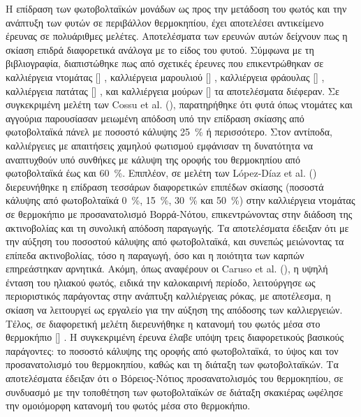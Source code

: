 \documentclass[12pt, a4paper]{report} %
\DeclareRobustCommand{\lcitep}[1]{%
  \english{[\cite{#1}]}%
}
\newcommand{\english}{\foreignlanguage{english}}
\begin{document}
Η επίδραση των φωτοβολταϊκών μονάδων ως προς την μετάδοση του φωτός και την ανάπτυξη των φυτών σε 
περιβάλλον θερμοκηπίου, έχει αποτελέσει αντικείμενο έρευνας σε πολυάριθμες μελέτες. Αποτελέσματα των ερευνών αυτών 
δείχνουν πως η σκίαση επιδρά διαφορετικά ανάλογα με το είδος του φυτού. Σύμφωνα με τη βιβλιογραφία, διαπιστώθηκε πως 
από σχετικές έρευνες που επικεντρώθηκαν σε καλλιέργεια ντομάτας 
\lcitep{eisagwgi_alg_bib24,eisagwgi_alg_bib25,eisagwgi_alg_bib14,strawberries_bib12}, καλλιέργεια μαρουλιού 
\lcitep{eisagwgi_alg_bib26}, καλλιέργεια φράουλας \lcitep{eisagwgi_alg_bib27,eisagwgi_alg_bib28,strawberries_bib13}, 
καλλιέργεια πατάτας \lcitep{eisagwgi_alg_bib29}, και καλλιέργεια μούρων \lcitep{eisagwgi_alg_bib14} τα αποτελέσματα 
διέφεραν. Σε συγκεκριμένη μελέτη των \english{Cossu et al.} (\citeyear{eisagwgi_alg_bib30}), παρατηρήθηκε ότι φυτά 
όπως ντομάτες και αγγούρια παρουσίασαν μειωμένη απόδοση υπό την επίδραση σκίασης από φωτοβολταϊκά πάνελ με ποσοστό 
κάλυψης \SI{25}{\percent} ή περισσότερο. Στον αντίποδα, καλλιέργειες με απαιτήσεις χαμηλού φωτισμού εμφάνισαν τη 
δυνατότητα να αναπτυχθούν υπό συνθήκες με κάλυψη της οροφής του θερμοκηπίου από φωτοβολταϊκά έως και \SI{60}{\percent}. 
Επιπλέον, σε μελέτη των \english{López-Díaz et al.} (\citeyear{eisagwgi_alg_bib31}) διερευνήθηκε η επίδραση τεσσάρων 
διαφορετικών επιπέδων σκίασης (ποσοστά κάλυψης από φωτοβολταϊκά \SI{0}{\percent}, \SI{15}{\percent}, \SI{30}{\percent} 
και \SI{50}{\percent}) στην καλλιέργεια ντομάτας σε θερμοκήπιο με προσανατολισμό Βορρά-Νότου, επικεντρώνοντας στην 
διάδοση της ακτινοβολίας και τη συνολική απόδοση παραγωγής. Τα αποτελέσματα έδειξαν ότι με την αύξηση του ποσοστού 
κάλυψης από φωτοβολταϊκά, και συνεπώς μειώνοντας τα επίπεδα ακτινοβολίας, τόσο η παραγωγή, όσο και η ποιότητα των 
καρπών επηρεάστηκαν αρνητικά. Ακόμη, όπως αναφέρουν οι \english{Caruso et al.} (\citeyear{strawberries_bib28}), 
η υψηλή ένταση του ηλιακού φωτός, ειδικά την καλοκαιρινή περίοδο, λειτούργησε ως περιοριστικός παράγοντας στην ανάπτυξη 
καλλιέργειας ρόκας, με αποτέλεσμα, η σκίαση να λειτουργεί ως εργαλείο για την αύξηση της απόδοσης των καλλιεργειών. 
Τέλος, σε διαφορετική μελέτη διερευνήθηκε η κατανομή του φωτός μέσα στο θερμοκήπιο 
\lcitep{eisagwgi_alg_bib32}. Η συγκεκριμένη έρευνα έλαβε υπόψη τρεις διαφορετικούς βασικούς παράγοντες: το ποσοστό 
κάλυψης της οροφής από φωτοβολταϊκά, το ύψος και τον προσανατολισμό του θερμοκηπίου, καθώς και τη διάταξη των 
φωτοβολταϊκών. Τα αποτελέσματα έδειξαν ότι ο Βόρειος-Νότιος προσανατολισμός του θερμοκηπίου, σε συνδυασμό με την 
τοποθέτηση των φωτοβολταϊκών σε διάταξη σκακιέρας ωφέλησε την ομοιόμορφη κατανομή του φωτός μέσα στο θερμοκήπιο.
\end{document}
